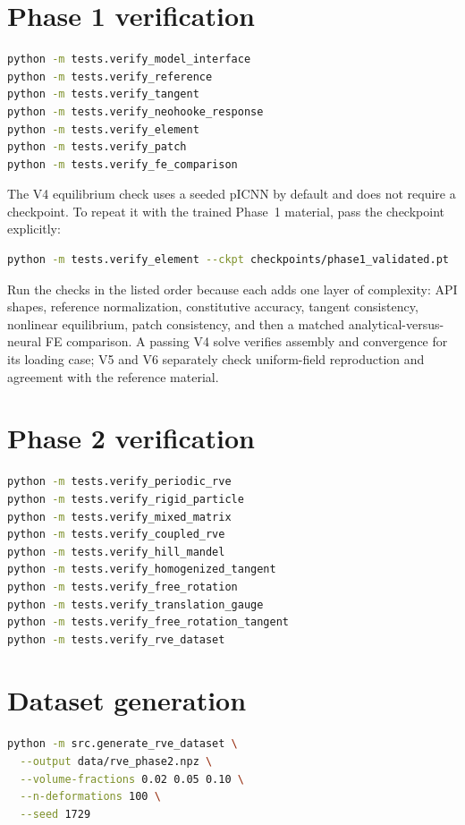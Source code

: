 \section{Phase 1 verification}

\begin{lstlisting}[language=bash]
python -m tests.verify_model_interface
python -m tests.verify_reference
python -m tests.verify_tangent
python -m tests.verify_neohooke_response
python -m tests.verify_element
python -m tests.verify_patch
python -m tests.verify_fe_comparison
\end{lstlisting}

The V4 equilibrium check uses a seeded pICNN by default and does not require a
checkpoint. To repeat it with the trained Phase~1 material, pass the checkpoint
explicitly:
\begin{lstlisting}[language=bash]
python -m tests.verify_element --ckpt checkpoints/phase1_validated.pt
\end{lstlisting}
Run the checks in the listed order because each adds one layer of
complexity: API shapes, reference normalization, constitutive accuracy,
tangent consistency, nonlinear equilibrium, patch consistency, and then a
matched analytical-versus-neural FE comparison. A passing V4 solve verifies
assembly and convergence for its loading case; V5 and V6 separately check
uniform-field reproduction and agreement with the reference material.

\section{Phase 2 verification}

\begin{lstlisting}[language=bash]
python -m tests.verify_periodic_rve
python -m tests.verify_rigid_particle
python -m tests.verify_mixed_matrix
python -m tests.verify_coupled_rve
python -m tests.verify_hill_mandel
python -m tests.verify_homogenized_tangent
python -m tests.verify_free_rotation
python -m tests.verify_translation_gauge
python -m tests.verify_free_rotation_tangent
python -m tests.verify_rve_dataset
\end{lstlisting}

\section{Dataset generation}

\begin{lstlisting}[language=bash]
python -m src.generate_rve_dataset \
  --output data/rve_phase2.npz \
  --volume-fractions 0.02 0.05 0.10 \
  --n-deformations 100 \
  --seed 1729
\end{lstlisting}

